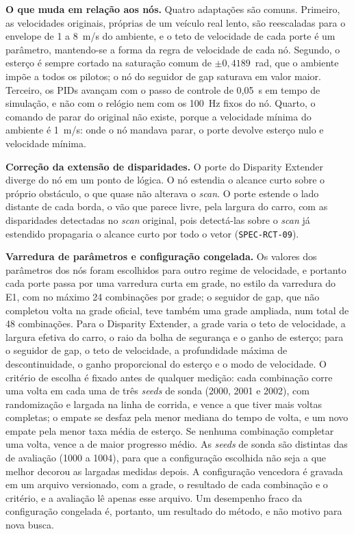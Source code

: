 \textbf{O que muda em relação aos nós.} Quatro adaptações são comuns. Primeiro, as
velocidades originais, próprias de um veículo real lento, são reescaladas para o
envelope de 1 a 8~m/s do ambiente, e o teto de velocidade de cada porte é um
parâmetro, mantendo-se a forma da regra de velocidade de cada nó. Segundo, o
esterço é sempre cortado na saturação comum de $\pm 0{,}4189$~rad, que o ambiente
impõe a todos os pilotos; o nó do seguidor de gap saturava em valor maior.
Terceiro, os PIDs avançam com o passo de controle de 0,05~s em tempo de simulação,
e não com o relógio nem com os 100~Hz fixos do nó. Quarto, o comando de parar do
original não existe, porque a velocidade mínima do ambiente é 1~m/s: onde o nó
mandava parar, o porte devolve esterço nulo e velocidade mínima.

\textbf{Correção da extensão de disparidades.} O porte do Disparity Extender
diverge do nó em um ponto de lógica. O nó estendia o alcance curto sobre o
próprio obstáculo, o que quase não alterava o \textit{scan}. O porte estende o
lado distante de cada borda, o vão que parece livre, pela largura do carro, com as
disparidades detectadas no \textit{scan} original, pois detectá-las sobre o
\textit{scan} já estendido propagaria o alcance curto por todo o vetor
(\texttt{SPEC-RCT-09}).

\textbf{Varredura de parâmetros e configuração congelada.} Os valores dos
parâmetros dos nós foram escolhidos para outro regime de velocidade, e portanto
cada porte passa por uma varredura curta em grade, no estilo da varredura do E1,
com no máximo 24 combinações por grade; o seguidor de gap, que não completou volta
na grade oficial, teve também uma grade ampliada, num total de 48 combinações. Para o Disparity Extender, a grade varia o teto de
velocidade, a largura efetiva do carro, o raio da bolha de segurança e o ganho de
esterço; para o seguidor de gap, o teto de velocidade, a profundidade máxima de
descontinuidade, o ganho proporcional do esterço e o modo de velocidade. O
critério de escolha é fixado antes de qualquer medição: cada combinação corre
uma volta em cada uma de três \textit{seeds} de sonda (2000, 2001 e 2002), com
randomização e largada na linha de corrida, e vence a que tiver mais voltas
completas; o empate se desfaz pela menor mediana do tempo de volta, e um novo
empate pela menor taxa média de esterço. Se nenhuma combinação completar uma
volta, vence a de maior progresso médio. As \textit{seeds} de sonda são
distintas das de avaliação (1000 a 1004), para que a configuração escolhida não
seja a que melhor decorou as largadas medidas depois. A configuração vencedora é
gravada em um arquivo versionado, com a grade, o resultado de cada combinação e o
critério, e a avaliação lê apenas esse arquivo. Um desempenho fraco da
configuração congelada é, portanto, um resultado do método, e não motivo para
nova busca.

